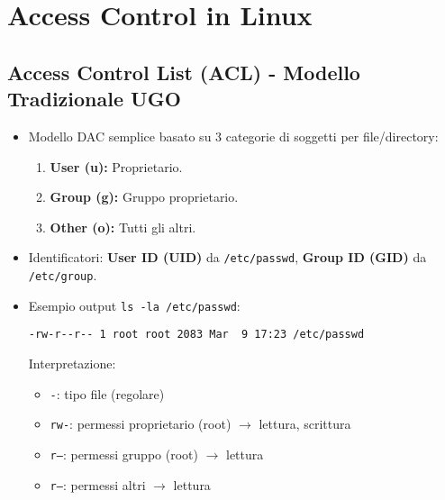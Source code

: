 \section{Access Control in Linux}
\subsection{Access Control List (ACL) - Modello Tradizionale UGO}
\begin{itemize}
    \item Modello DAC semplice basato su 3 categorie di soggetti per file/directory:
    \begin{enumerate}
        \item \textbf{User (u):} Proprietario.
        \item \textbf{Group (g):} Gruppo proprietario.
        \item \textbf{Other (o):} Tutti gli altri.
    \end{enumerate}
    \item Identificatori: \textbf{User ID (UID)} da \texttt{/etc/passwd}, \textbf{Group ID (GID)} da \texttt{/etc/group}.
    \item Esempio output \texttt{ls -la /etc/passwd}:
    \begin{verbatim}
-rw-r--r-- 1 root root 2083 Mar  9 17:23 /etc/passwd
    \end{verbatim}
    Interpretazione:
    \begin{itemize}
        \item \texttt{-}: tipo file (regolare)
        \item \texttt{rw-}: permessi proprietario (root) $\rightarrow$ lettura, scrittura
        \item \texttt{r--}: permessi gruppo (root) $\rightarrow$ lettura
        \item \texttt{r--}: permessi altri $\rightarrow$ lettura
    \end{itemize}
\end{itemize}

